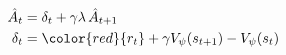 \begin{align*}
\hat{A}_t &= \delta_t + \gamma\lambda\,\hat{A}_{t+1} \\
\delta_t &= {\color{red}{r_t}} + \gamma V_{\psi}(s_{t+1}) - V_{\psi}(s_t)
\end{align*}